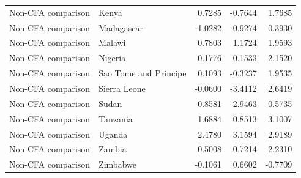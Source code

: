 \begin{table}
\begin{tabular}[t]{llrrr}
Non-CFA comparison & Kenya & 0.7285 & -0.7644 & 1.7685\\
\addlinespace
Non-CFA comparison & Madagascar & -1.0282 & -0.9274 & -0.3930\\
Non-CFA comparison & Malawi & 0.7803 & 1.1724 & 1.9593\\
Non-CFA comparison & Nigeria & 0.1776 & 0.1533 & 2.1520\\
Non-CFA comparison & Sao Tome and Principe & 0.1093 & -0.3237 & 1.9535\\
Non-CFA comparison & Sierra Leone & -0.0600 & -3.4112 & 2.6419\\
\addlinespace
Non-CFA comparison & Sudan & 0.8581 & 2.9463 & -0.5735\\
Non-CFA comparison & Tanzania & 1.6884 & 0.8513 & 3.1007\\
Non-CFA comparison & Uganda & 2.4780 & 3.1594 & 2.9189\\
Non-CFA comparison & Zambia & 0.5008 & -0.7214 & 2.2310\\
Non-CFA comparison & Zimbabwe & -0.1061 & 0.6602 & -0.7709\\
\bottomrule
\end{tabular}
\end{table}